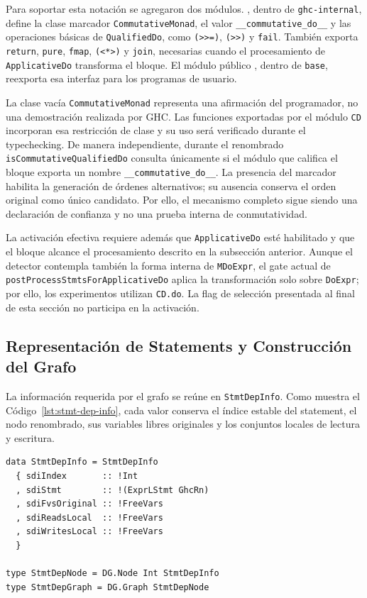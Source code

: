 Para soportar esta notación se agregaron dos módulos. , dentro de \texttt{ghc-internal}, define la clase marcador \texttt{CommutativeMonad}, el valor \texttt{\_\_commutative\_do\_\_} y las operaciones básicas de \texttt{QualifiedDo}, como \verb|(>>=)|, \verb|(>>)| y \texttt{fail}. También exporta \texttt{return}, \texttt{pure}, \texttt{fmap}, \verb|(<*>)| y \texttt{join}, necesarias cuando el procesamiento de \texttt{ApplicativeDo} transforma el bloque. El módulo público , dentro de \texttt{base}, reexporta esa interfaz para los programas de usuario.

La clase vacía \texttt{CommutativeMonad} representa una afirmación del programador, no una demostración realizada por \textsf{GHC}. Las funciones exportadas por el módulo \texttt{CD} incorporan esa restricción de clase y su uso será verificado durante el typechecking. De manera independiente, durante el renombrado \texttt{isCommutativeQualifiedDo} consulta únicamente si el módulo que califica el bloque exporta un nombre \texttt{\_\_commutative\_do\_\_}. La presencia del marcador habilita la generación de órdenes alternativos; su ausencia conserva el orden original como único candidato. Por ello, el mecanismo completo sigue siendo una declaración de confianza y no una prueba interna de conmutatividad.

La activación efectiva requiere además que \texttt{ApplicativeDo} esté habilitado y que el bloque alcance el procesamiento descrito en la subsección anterior. Aunque el detector contempla también la forma interna de \texttt{MDoExpr}, el gate actual de \texttt{postProcessStmtsForApplicativeDo} aplica la transformación solo sobre \texttt{DoExpr}; por ello, los experimentos utilizan \texttt{CD.do}. La flag de selección presentada al final de esta sección no participa en la activación.

\subsection{Representación de Statements y Construcción del Grafo}
\label{sec:solucion-implementacion-grafo}

La información requerida por el grafo se reúne en \texttt{StmtDepInfo}. Como muestra el Código~\ref{lst:stmt-dep-info}, cada valor conserva el índice estable del statement, el nodo renombrado, sus variables libres originales y los conjuntos locales de lectura y escritura.

\begin{lstlisting}[style=haskell,caption={Información de dependencias almacenada para cada statement.},label={lst:stmt-dep-info}]
data StmtDepInfo = StmtDepInfo
  { sdiIndex       :: !Int
  , sdiStmt        :: !(ExprLStmt GhcRn)
  , sdiFvsOriginal :: !FreeVars
  , sdiReadsLocal  :: !FreeVars
  , sdiWritesLocal :: !FreeVars
  }

type StmtDepNode = DG.Node Int StmtDepInfo
type StmtDepGraph = DG.Graph StmtDepNode
\end{lstlisting}

